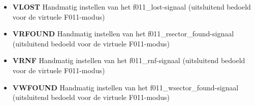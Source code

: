 \begin{itemize}
\item{\bf{VLOST}} Handmatig instellen van het f011\_lost-signaal (uitsluitend bedoeld voor de virtuele F011-modus)
\item{\bf{VRFOUND}} Handmatig instellen van het f011\_rsector\_found-signaal (uitsluitend bedoeld voor de virtuele F011-modus)
\item{\bf{VRNF}} Handmatig instellen van het f011\_rnf-signaal (uitsluitend bedoeld voor de virtuele F011-modus)
\item{\bf{VWFOUND}} Handmatig instellen van het f011\_wsector\_found-signaal (uitsluitend bedoeld voor de virtuele F011-modus)
\end{itemize}
